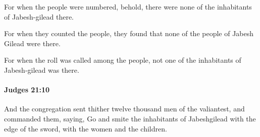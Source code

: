 			\begin{versebox}
					\item[BHS] 
					\item[ASV] For when the people were numbered, behold, there were none of the inhabitants of Jabesh-gilead there.
					\item[NIV] For when they counted the people, they found that none of the people of Jabesh Gilead were there.
					\item[NRSV] For when the roll was called among the people, not one of the inhabitants of Jabesh-gilead was there.
			\end{versebox}

		\paragraph{Judges 21:10} %
			\label{JUDGES-21-10}

			And the congregation sent thither twelve thousand men of the valiantest, and commanded them, saying, Go and smite the inhabitants of Jabeshgilead with the edge of the sword, with the women and the children.

